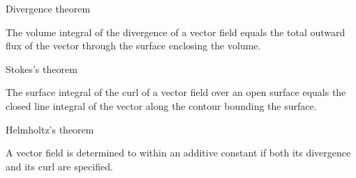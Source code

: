 \begin{ELtheorem}{Divergence theorem}

The volume integral of the divergence of a vector field equals the total outward flux of the vector through the surface enclosing the volume.

\end{ELtheorem}

\begin{ELunit}


\end{ELunit}

\begin{ELtheorem}{Stokes's theorem}

The surface integral of the curl of a vector field over an open surface equals the closed line integral of the vector along the contour bounding the surface.

\end{ELtheorem}

\begin{ELunit}


\end{ELunit}

\begin{ELtheorem}{Helmholtz's theorem}

A vector field is determined to within an additive constant if both its divergence and its curl are specified.

\end{ELtheorem}


